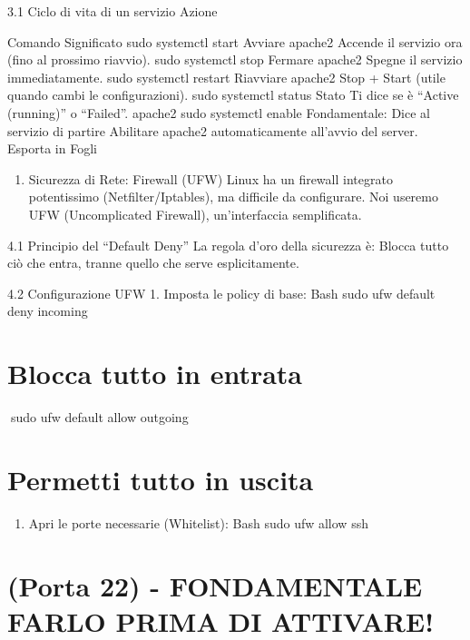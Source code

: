\documentclass[11pt,a4paper]{article}
\providecommand{\tightlist}{%
  \setlength{\itemsep}{0pt}\setlength{\parskip}{0pt}}
\begin{document}
3.1 Ciclo di vita di un servizio Azione

Comando Significato sudo systemctl start Avviare apache2 Accende il
servizio ora (fino al prossimo riavvio). sudo systemctl stop Fermare
apache2 Spegne il servizio immediatamente. sudo systemctl restart
Riavviare apache2 Stop + Start (utile quando cambi le configurazioni).
sudo systemctl status Stato Ti dice se è ``Active (running)'' o
``Failed''. apache2 sudo systemctl enable Fondamentale: Dice al servizio
di partire Abilitare apache2 automaticamente all'avvio del server.
Esporta in Fogli

\begin{enumerate}
\def\labelenumi{\arabic{enumi}.}
\setcounter{enumi}{3}
\tightlist
\item
  Sicurezza di Rete: Firewall (UFW) Linux ha un firewall integrato
  potentissimo (Netfilter/Iptables), ma difficile da configurare. Noi
  useremo UFW (Uncomplicated Firewall), un'interfaccia semplificata.
\end{enumerate}

4.1 Principio del ``Default Deny'' La regola d'oro della sicurezza è:
Blocca tutto ciò che entra, tranne quello che serve esplicitamente.

4.2 Configurazione UFW 1. Imposta le policy di base: Bash sudo ufw
default deny incoming

\section{Blocca tutto in entrata}\label{blocca-tutto-in-entrata}

sudo ufw default allow outgoing

\section{Permetti tutto in uscita}\label{permetti-tutto-in-uscita}

\begin{enumerate}
\def\labelenumi{\arabic{enumi}.}
\setcounter{enumi}{1}
\tightlist
\item
  Apri le porte necessarie (Whitelist): Bash sudo ufw allow ssh
\end{enumerate}

\section{(Porta 22) - FONDAMENTALE FARLO PRIMA DI
ATTIVARE!}\label{porta-22---fondamentale-farlo-prima-di-attivare}
\end{document}
